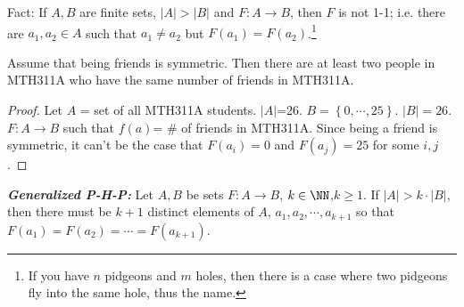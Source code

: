 \noindent
Fact: If $A,B$ are finite sets, $|A|>|B|$ and $F:A\to B$, then $F$ is not 1-1; i.e. there are $a_1,a_2\in A$ such that $a_1 \neq a_2$ but $F(a_1)=F(a_2)$.\footnote{If you have $n$ pidgeons and $m$ holes, then there is a case where two pidgeons fly into the same hole, thus the name.}
\begin{example}
Assume that being friends is symmetric. Then there are at least two people in MTH311A who have the same number of friends in MTH311A.
\end{example}
\begin{proof}
Let $A$ = set of all MTH311A students. $|A|$=26. $B=\left\{0,\cdots,25\right\}$. $|B|=26$. $F:A\to B$ such that $f(a)$= \# of friends in MTH311A. Since being a friend is symmetric, it can't be the case that $F(a_i)=0$ and $F(a_j)=25$ for some $i,j$.
\end{proof}
\noindent
\textbf{\emph{Generalized P-H-P:}} Let $A,B$ be sets $F:A\to B$, $k\in\NN$,$k\ge1$. If $|A|>k\cdot|B|$, then there must be $k+1$ distinct elements of $A$, $a_1,a_2,\cdots,a_{k+1}$ so that $F(a_1)=F(a_2)=\cdots=F(a_{k+1})$.


